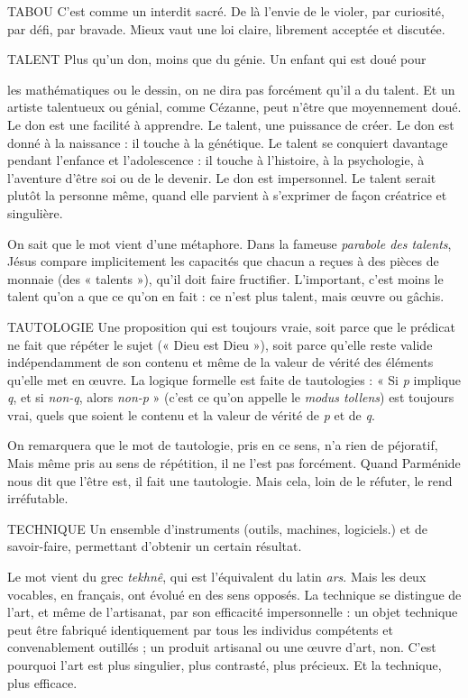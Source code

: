 TABOU C’est comme un interdit sacré. De là l’envie de le violer, par curiosité,
par défi, par bravade. Mieux vaut une loi claire, librement
acceptée et discutée.

TALENT Plus qu’un don, moins que du génie. Un enfant qui est doué pour

les mathématiques ou le dessin, on ne dira pas forcément qu’il a du
talent. Et un artiste talentueux ou génial, comme Cézanne, peut n'être que
moyennement doué. Le don est une facilité à apprendre. Le talent, une puissance
de créer. Le don est donné à la naissance : il touche à la génétique. Le
talent se conquiert davantage pendant l’enfance et l’adolescence : il touche à
l’histoire, à la psychologie, à l'aventure d’être soi ou de le devenir. Le don est
impersonnel. Le talent serait plutôt la personne même, quand elle parvient à
s'exprimer de façon créatrice et singulière.

On sait que le mot vient d’une métaphore. Dans la fameuse {\it parabole des
talents}, Jésus compare implicitement les capacités que chacun a reçues à des
pièces de monnaie (des « talents »), qu’il doit faire fructifier. L'important, c’est
moins le talent qu’on a que ce qu’on en fait : ce n’est plus talent, mais œuvre
ou gâchis.

TAUTOLOGIE Une proposition qui est toujours vraie, soit parce que le prédicat
ne fait que répéter le sujet (« Dieu est Dieu »), soit
parce qu’elle reste valide indépendamment de son contenu et même de la
valeur de vérité des éléments qu’elle met en œuvre. La logique formelle est faite
de tautologies : « Si {\it p} implique {\it q}, et si {\it non-q}, alors {\it non-p} » (c'est ce qu’on
appelle le {\it modus tollens}) est toujours vrai, quels que soient le contenu et la
valeur de vérité de {\it p} et de {\it q}.

On remarquera que le mot de tautologie, pris en ce sens, n’a rien de péjoratif,
Mais même pris au sens de répétition, il ne l’est pas forcément. Quand
Parménide nous dit que l’être est, il fait une tautologie. Mais cela, loin de le
réfuter, le rend irréfutable.

TECHNIQUE Un ensemble d'instruments (outils, machines, logiciels.) et
de savoir-faire, permettant d’obtenir un certain résultat.

Le mot vient du grec {\it tekhnê}, qui est l’équivalent du latin {\it ars}. Mais les deux
vocables, en français, ont évolué en des sens opposés. La technique se distingue
de l’art, et même de l’artisanat, par son efficacité impersonnelle : un objet technique
peut être fabriqué identiquement par tous les individus compétents et
convenablement outillés ; un produit artisanal ou une œuvre d’art, non. C’est
pourquoi l’art est plus singulier, plus contrasté, plus précieux. Et la technique,
plus efficace.

